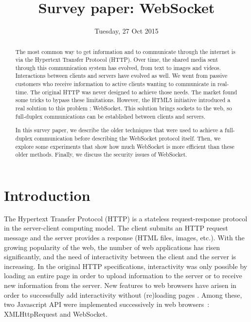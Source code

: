 \documentclass[journal,compsoc]{IEEEtran}
\newcommand{\ws}{WebSocket}
\begin{document}
\author{}

\title{Survey paper: \ws}

\date{Tuesday, 27 Oct 2015}

\maketitle
\IEEEpeerreviewmaketitle



\begin{abstract}
The most common way to get information and to communicate through the internet is via the Hypertext Transfer Protocol (HTTP).
Over time, the shared media sent through this communication system has evolved, from text to images and videos.
Interactions between clients and servers have evolved as well.
We went from passive customers who receive information to active clients wanting to communicate in real-time.
The original HTTP was never designed to achieve those needs.
The market found some tricks to bypass these limitations.
However, the HTML5 initiative introduced a real solution to this problem : \ws{}.
This solution brings sockets to the web, so full-duplex communications can be established between clients and servers.

In this survey paper, we describe the older techniques that were used to achieve a full-duplex communication before describing the \ws{} protocol itself.
Then, we explore some experiments that show how much \ws{} is more efficient than these older methods.
Finally, we discuss the security issues of \ws{}.
\end{abstract}


\section{Introduction}

The Hypertext Transfer Protocol (HTTP) is a stateless request-response protocol in the server-client computing model.
The client submits an HTTP request message and the server provides a response (HTML files, images, etc.).
With the growing popularity of the web, the number of web applications has risen significantly, and the need of interactivity between the client and the server is increasing.
In the original HTTP specifications, interactivity was only possible by loading an entire page in order to upload information to the server or to receive new information from the server.
New features to web browsers have arisen in order to successfully add interactivity without (re)loading pages \cite{RealTimeMonitoringUsingAJAXAndWebSockets}.
Among these, two Javascript API were implemented successively in web \mbox{browsers :} XMLHttpRequest and \ws.
\end{document}
